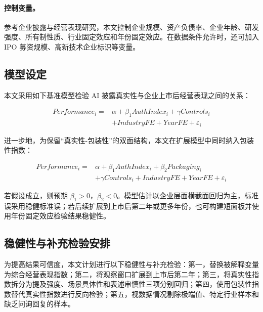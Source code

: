 \paragraph{控制变量。} 参考企业披露与经营表现研究，本文控制企业规模、资产负债率、企业年龄、研发强度、所有制性质、行业固定效应和年份固定效应。在数据条件允许时，还可加入 IPO 募资规模、高新技术企业标识等变量。

\subsection{模型设定}

本文采用如下基准模型检验 AI 披露真实性与企业上市后经营表现之间的关系：

\begin{equation}
\begin{aligned}
Performance_i = {} & \alpha + \beta_1 AuthIndex_i + \gamma Controls_i \\
& + IndustryFE + YearFE + \varepsilon_i
\end{aligned}
\end{equation}

进一步地，为保留“真实性-包装性”的双面结构，本文在扩展模型中同时纳入包装性指数：

\begin{equation}
\begin{aligned}
Performance_i = {} & \alpha + \beta_1 AuthIndex_i + \beta_2 Packaging_i \\
& + \gamma Controls_i + IndustryFE + YearFE + \varepsilon_i
\end{aligned}
\end{equation}

若假设成立，则预期 $\beta_1 > 0$，$\beta_2 < 0$。模型估计以企业层面横截面回归为主，标准误采用稳健标准误；若后续扩展到上市后第二年或更多年份，也可构建短面板并使用年份固定效应检验结果稳健性。

\subsection{稳健性与补充检验安排}

为提高结果可信度，本文计划进行以下稳健性与补充检验：第一，替换被解释变量为综合经营表现指数；第二，将观察窗口扩展到上市后第二年；第三，将真实性指数拆分为提及强度、场景具体性和表述审慎性三项分别回归；第四，使用包装性指数替代真实性指数进行反向检验；第五，视数据情况剔除极端值、特定行业样本和缺乏问询回复的样本。
